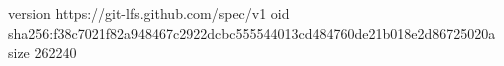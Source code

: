 version https://git-lfs.github.com/spec/v1
oid sha256:f38c7021f82a948467c2922dcbc555544013cd484760de21b018e2d86725020a
size 262240
